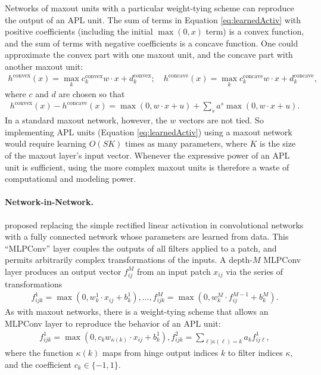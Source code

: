 \documentclass{article} \usepackage{iclr2015,times}
\begin{document}
Networks of maxout units with a particular weight-tying scheme can
reproduce the output of an APL unit. The sum of terms in
Equation \ref{eq:learnedActiv} with positive coefficients (including
the initial $\max(0, x)$ term) is a convex function, and the sum of
terms with negative coefficients is a concave function. One could
approximate the convex part with one maxout unit, and the concave part
with another maxout unit:
\begin{equation}
\begin{split}
h^\mathrm{convex}(x) = \max_k c^{\mathrm{convex}}_k w\cdot x + d^{\mathrm{convex}}_k;
\quad
h^\mathrm{concave}(x) = \max_k c^{\mathrm{concave}}_k w\cdot x + d^{\mathrm{concave}}_k,
\end{split}
\end{equation}
where $c$ and $d$ are chosen so that
\begin{equation}
\begin{split}
\textstyle
h^\mathrm{convex}(x) - h^\mathrm{concave}(x)
= \max(0, w\cdot x + u) + \sum_s a^s \max(0, w\cdot x + u).
\end{split}
\end{equation}
In a standard maxout network, however, the $w$ vectors are not tied.
So implementing APL units (Equation \ref{eq:learnedActiv}) using a maxout network would require
learning $O(SK)$ times as many parameters, where $K$ is the size of
the maxout layer's input vector. Whenever the expressive power of an
APL unit is sufficient, using the more complex
maxout units is therefore a waste of computational and modeling power.





\paragraph{Network-in-Network.}
\citet{lin2013network} proposed replacing the simple rectified linear activation in convolutional networks with a fully
connected network whose parameters are learned from data.  This
``MLPConv'' layer couples the outputs of all filters applied to a
patch, and permits arbitrarily complex transformations of the inputs.
A depth-$M$ MLPConv layer produces an output vector $f^M_{ij}$ from an
input patch $x_{ij}$ via the series of transformations
\begin{equation}
\begin{split}
f^1_{ijk} = \max(0, w_k^1\cdot x_{ij} + b_k^1),\ldots,
f^M_{ijk} = \max(0, w_k^M\cdot f_{ij}^{M-1} + b_k^M).
\end{split}
\end{equation}
As with maxout networks, there is a weight-tying scheme that allows an
MLPConv layer to reproduce the behavior of an APL unit:
\begin{equation}
\begin{split}
\textstyle
f^1_{ijk} = \max(0, c_k w_{\kappa(k)}\cdot x_{ij} + b_{k}^1),
f^2_{ijk} = \sum_{\ell|\kappa(\ell)=k} a_k f^1_{ij\ell},
\end{split}
\end{equation}
where the function $\kappa(k)$ maps from hinge output indices $k$ to
filter indices $\kappa$, and the coefficient $c_k\in\{-1, 1\}$.
\end{document}
